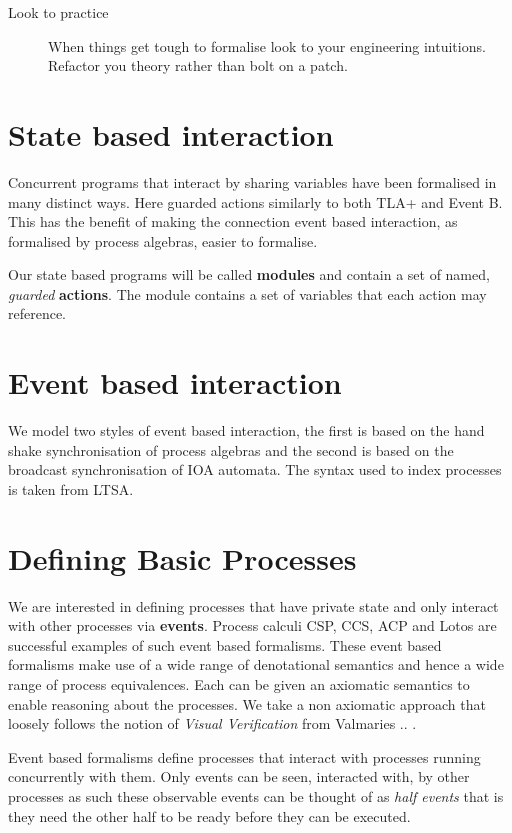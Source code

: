 \documentclass[]{article}
\begin{document}
{\begin{description}
\item[Look to practice]  When things get tough to formalise look to your engineering intuitions. Refactor you theory rather than bolt on a patch.
\end{description}

\section{State based interaction}
Concurrent programs that interact by sharing variables have been formalised in many distinct ways. Here guarded actions similarly to both TLA+  and Event B.  This has the benefit of making the  connection  event based interaction, as formalised by process algebras, easier to formalise.

Our state based programs will be called {\bf modules} and contain a set of named, \emph{guarded} {\bf actions}. The module contains a set of variables  that each action may reference. 

\section{Event based interaction}
We model two styles of  event based interaction, the first  is based on the hand shake synchronisation of   process algebras and the second is based on the broadcast synchronisation of IOA automata. The syntax used to index processes is taken from LTSA.
}


\section{Defining Basic Processes}
We are interested in defining processes that have private state and only interact with other processes via {\bf events}. Process calculi CSP, CCS, ACP and  Lotos  are  successful examples of such event based formalisms.
These event based formalisms make use of a wide range of denotational semantics and hence  a wide range of process equivalences.  Each can be  given an axiomatic semantics to enable  reasoning about the processes. We take a non axiomatic  approach that loosely   follows the notion of \emph{Visual Verification}  from  Valmaries .. \cite{}.

Event based formalisms define processes that interact with processes running concurrently with them. Only events can be seen, interacted with, by other processes as such these observable events can be thought of as \emph{half events} that is they need the other half to be ready before they can be executed.
\end{document}
